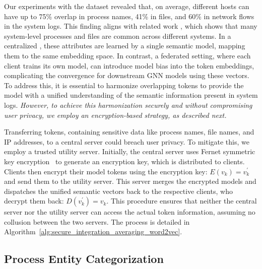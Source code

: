 
Our experiments with the \optc dataset revealed that, on average, different hosts can have up to 75\% overlap in process names, 41\% in files, and 60\% in network flows in the system logs. This finding aligns with related work \cite{flash2024}, which shows that many system-level processes and files are common across different systems. In a centralized \pids, these attributes are learned by a single semantic model, mapping them to the same embedding space. In contrast, a federated setting, where each client trains its own model, can introduce model bias into the token embeddings, complicating the convergence for downstream GNN models using these vectors. To address this, it is essential to harmonize overlapping tokens to provide the model with a unified understanding of the semantic information present in system logs.
\emph{However, to achieve this harmonization securely and without compromising user privacy, we employ an encryption-based strategy, as described next.}

Transferring tokens, containing sensitive data like process names, file names, and IP addresses, to a central server could breach user privacy. To mitigate this, we employ a trusted utility server. Initially, the central server uses Fernet symmetric key encryption~\cite{ismail2020fernet,bokhari2016review} to generate an encryption key, which is distributed to clients. Clients then encrypt their \wordvec model tokens using the encryption key: \(E(v_{k}) = v_{k}^{'}\) and send them to the utility server. This server merges the encrypted models and dispatches the unified semantic vectors back to the respective clients, who decrypt them back: \(D(v_{k}^{'}) = v_{k}.\) This procedure ensures that neither the central server nor the utility server can access the actual token information, assuming no collusion between the two servers. The process is detailed in Algorithm~\ref{alg:secure_integration_averaging_word2vec}.



\subsection{Process Entity Categorization}
\label{sys:catg}


